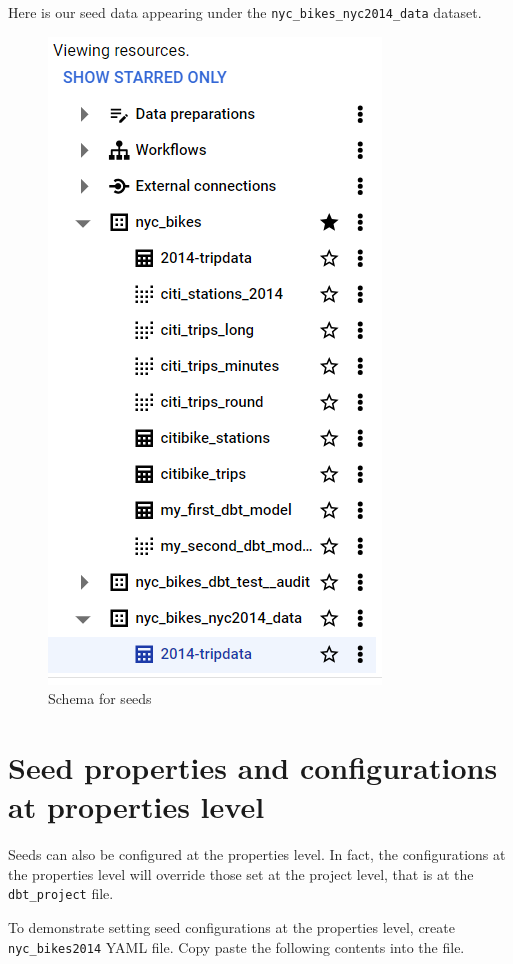 \documentclass[
]{book}
\begin{document}
Here is our seed data appearing under the \texttt{nyc\_bikes\_nyc2014\_data} dataset.

\begin{figure}
\centering
\includegraphics{./images/seeds_schema.png}
\caption{Schema for seeds}
\end{figure}

\hypertarget{seed-properties-and-configurations-at-properties-level}{%
\section{Seed properties and configurations at properties level}\label{seed-properties-and-configurations-at-properties-level}}

Seeds can also be configured at the properties level. In fact, the configurations at the properties level will override those set at the project level, that is at the \texttt{dbt\_project} file.

To demonstrate setting seed configurations at the properties level, create \texttt{nyc\_bikes2014} YAML file. Copy paste the following contents into the file.
\end{document}
